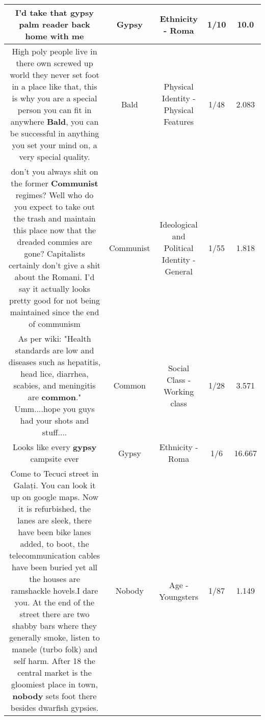 \documentclass[11pt]{article}
\newlength\mylength
\begin{document}
\begin{center}
\begin{longtable}{|C{.65\mylength}|C{.30\mylength}|C{.12\mylength}|C{.12\mylength}|C{.12\mylength}|}
  \small I'd take that \textbf{gypsy} palm reader back home with me\normalsize   & Gypsy & Ethnicity - Roma & 1/10 & 10.0 \\  \hline
  \small High poly people live in there own screwed up world they never set foot in a place like that, this is why you are a special person you can fit in anywhere \textbf{Bald}, you can be successful in anything you set your mind on, a very special quality.\normalsize   & Bald & Physical Identity - Physical Features & 1/48 & 2.083 \\  \hline
  \small don't you always shit on the former \textbf{Communist} regimes? Well who do you expect to take out the trash and maintain this place now that the dreaded commies are gone? Capitalists certainly don't give a shit about the Romani. I'd say it actually looks pretty good for not being maintained since the end of communism\normalsize   & Communist &  Ideological and Political Identity - General & 1/55 & 1.818 \\  \hline
  \small As per wiki: "Health standards are low and diseases such as hepatitis, head lice, diarrhea, scabies, and meningitis are \textbf{common}."  Umm....hope you guys had your shots and stuff....\normalsize   & Common & Social Class - Working class & 1/28 & 3.571 \\  \hline
  \small Looks like every \textbf{gypsy} campsite ever\normalsize   & Gypsy & Ethnicity - Roma & 1/6 & 16.667 \\  \hline
  \small Come to Tecuci street in Galați. You can look it up on google maps. Now it is refurbished, the lanes are sleek, there have been bike lanes added, to boot, the telecommunication cables have been buried yet all the houses are ramshackle hovels.I dare you. At the end of the street there are two shabby bars where they generally smoke, listen to manele (turbo folk) and self harm. After 18 the central market is the gloomiest place in town, \textbf{nobody} sets foot there besides dwarfish gypsies.\normalsize   & Nobody & Age - Youngsters & 1/87 & 1.149 \\  \hline

\end{longtable}
\end{center}
\end{document}
